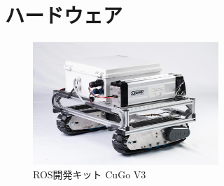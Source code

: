 \documentclass[platex,dvipdfmx]{rbproceedings}
\begin{document}
\section{ハードウェア}
\begin{figure}[htbp]
    \centering   
    \includegraphics[keepaspectratio,width=70mm]{fig/cugo_ros.jpg}
    \caption{ROS開発キット CuGo V3}
    \label{fig:cugo_ros}
\end{figure}
\end{document}
